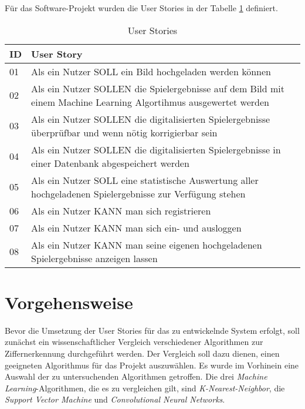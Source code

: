 Für das Software-Projekt wurden die User Stories in der Tabelle \ref{table:user_stories} definiert.
\begin{table}[]
    \begin{tabular}{m{2.5cm}|m{12cm}}
    \textbf{ID} & \textbf{User Story}                                                                                              \\ \hline
    01          & Als ein Nutzer SOLL ein Bild hochgeladen werden können                                                           \\
    02          & Als ein Nutzer SOLLEN die Spielergebnisse auf dem Bild mit einem Machine Learning Algortihmus ausgewertet werden \\
    03          & Als ein Nutzer SOLLEN die digitalisierten Spielergebnisse überprüfbar und wenn nötig korrigierbar sein           \\
    04          & Als ein Nutzer SOLLEN die digitalisierten Spielergebnisse in einer Datenbank abgespeichert werden                \\
    05          & Als ein Nutzer SOLL eine statistische Auswertung aller hochgeladenen Spielergebnisse zur Verfügung stehen        \\
    06          & Als ein Nutzer KANN man sich registrieren                                                                        \\
    07          & Als ein Nutzer KANN man sich ein- und ausloggen                                                                  \\
    08          & Als ein Nutzer KANN man seine eigenen hochgeladenen Spielergebnisse anzeigen lassen                             
    \end{tabular}
    \caption{User Stories}
    \label{table:user_stories}
\end{table}

\section{Vorgehensweise}
Bevor die Umsetzung der User Stories für das zu entwickelnde System erfolgt, soll zunächst ein wissenschaftlicher Vergleich verschiedener Algorithmen zur Ziffernerkennung durchgeführt werden. Der Vergleich soll dazu dienen, einen geeigneten Algorithmus für das Projekt auszuwählen. Es wurde im Vorhinein eine Auswahl der zu untersuchenden Algorithmen getroffen. Die drei \textit{Machine Learning}-Algorithmen, die es zu vergleichen gilt, sind \textit{K-Nearest-Neighbor}, die \textit{Support Vector Machine} und \textit{Convolutional Neural Networks}.

